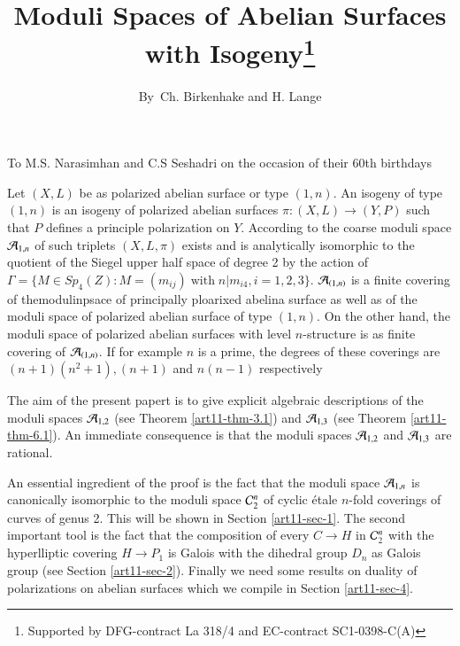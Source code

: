 \title{Moduli Spaces of Abelian Surfaces with Isogeny\footnote{Supported by DFG-contract La 318/4 and EC-contract SC1-0398-C(A)}}

\author{By~Ch. Birkenhake and H. Lange}


\date{}
\maketitle

\begin{center}
To M.S. Narasimhan and C.S Seshadri on the occasion of their 60th birthdays
\end{center}

\noindent
Let $(X, L)$ be as polarized abelian surface or type $(1,n)$. An isogeny of type $(1,n)$ is an isogeny of polarized abelian surfaces $\pi : (X, L)\rightarrow (Y, P)$ such that $P$ defines a principle polarization on $Y$.
According to \cite{art11-keyH-W} the coarse moduli space $\mathcal{A}_{1,n}$ of such triplets $(X, L, \pi)$ exists and is analytically isomorphic to the quotient of the Siegel upper half space of degree 2 by the action of $\Gamma = \{M \in Sp_{4}(Z): M= (m_{ij}) \;\text{with}\; n|m_{i4}, i= 1,2,3\}$. $\mathcal{A}_{(1,n)}$ is a finite covering of themodulinpsace of principally ploarixed abelina surface as well as of the moduli space of polarized abelian surface of type $(1,n)$. On the other hand, the moduli space of polarized abelian surfaces with level $n$-structure is as finite covering of $\mathcal{A}_{(1,n)}$. If for example $n$ is a prime, the degrees of these coverings are $(n+1)(n^{2}+1), (n+1)$ and $ n(n-1)$ respectively

The aim of the present papert is to give explicit algebraic descriptions of the moduli spaces $\mathcal{A}_{1,2}$ (see Theorem \ref{art11-thm-3.1}) and $\mathcal{A}_{1,3}$ (see Theorem \ref{art11-thm-6.1}). An immediate consequence is that the moduli spaces $\mathcal{A}_{1,2}$ and $\mathcal{A}_{1,3}$ are rational.

An essential ingredient of the proof is the fact that the moduli space $\mathcal{A}_{1,n}$ is canonically isomorphic to the moduli space $\mathcal{C}_{2}^{n}$ of cyclic \'etale $n$-fold coverings of curves of genus 2. This will be shown
in Section \ref{art11-sec-1}. The second important tool is the fact that the composition of every $C \rightarrow H$ in $\mathcal{C}_{2}^{n}$ with the hyperlliptic covering $H \rightarrow P_{1}$ is Galois with the dihedral group $D_{n}$ as Galois group (see Section \ref{art11-sec-2}). Finally we need some results on duality of polarizations on abelian surfaces which we compile in Section \ref{art11-sec-4}.

